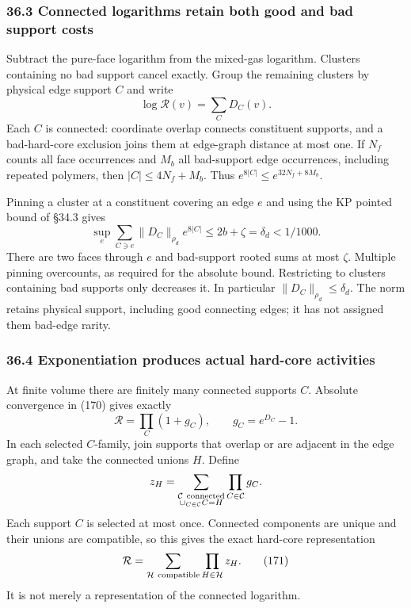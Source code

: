 \documentclass[11pt,a4paper]{article}
\begin{document}
\hypertarget{connected-logarithms-retain-both-good-and-bad-support-costs}{%
\subsubsection{36.3 Connected logarithms retain both good and bad
support
costs}\label{connected-logarithms-retain-both-good-and-bad-support-costs}}

Subtract the pure-face logarithm from the mixed-gas logarithm. Clusters
containing no bad support cancel exactly. Group the remaining clusters
by physical edge support \(C\) and write
\[\log\mathcal R(v)=\sum_C D_C(v).\] Each \(C\) is connected: coordinate
overlap connects constituent supports, and a bad-hard-core exclusion
joins them at edge-graph distance at most one. If \(N_f\) counts all
face occurrences and \(M_b\) all bad-support edge occurrences, including
repeated polymers, then \(|C|\le4N_f+M_b\). Thus
\(e^{8|C|}\le e^{32N_f+8M_b}\).

Pinning a cluster at a constituent covering an edge \(e\) and using the
KP pointed bound of §34.3 gives
\[\sup_e\sum_{C\ni e}\|D_C\|_{\rho_d}e^{8|C|}
 \le2b+\zeta=\delta_d<1/1000.\tag{170}\] There are two faces through
\(e\) and bad-support rooted sums at most \(\zeta\). Multiple pinning
overcounts, as required for the absolute bound. Restricting to clusters
containing bad supports only decreases it. In particular
\(\|D_C\|_{\rho_d}\le\delta_d\). The norm retains physical support,
including good connecting edges; it has not assigned them bad-edge
rarity.

\hypertarget{exponentiation-produces-actual-hard-core-activities}{%
\subsubsection{36.4 Exponentiation produces actual hard-core
activities}\label{exponentiation-produces-actual-hard-core-activities}}

At finite volume there are finitely many connected supports \(C\).
Absolute convergence in (170) gives exactly
\[\mathcal R=\prod_C(1+g_C),\qquad g_C=e^{D_C}-1.\] In each selected
\(C\)-family, join supports that overlap or are adjacent in the edge
graph, and take the connected unions \(H\). Define
\[z_H=\sum_{\substack{\mathcal C\ {\rm connected}\\
                         \cup_{C\in\mathcal C}C=H}}
             \prod_{C\in\mathcal C}g_C.\] Each support \(C\) is selected
at most once. Connected components are unique and their unions are
compatible, so this gives the exact hard-core representation
\[\mathcal R=\sum_{\mathcal H\ {\rm compatible}}
                    \prod_{H\in\mathcal H}z_H.\tag{171}\] It is not
merely a representation of the connected logarithm.
\end{document}
